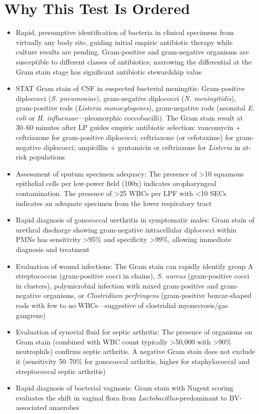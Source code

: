 \section*{Why This Test Is Ordered}
\begin{itemize}
  \item Rapid, presumptive identification of bacteria in clinical specimens from virtually any body site, guiding initial empiric antibiotic therapy while culture results are pending. Gram-positive and gram-negative organisms are susceptible to different classes of antibiotics; narrowing the differential at the Gram stain stage has significant antibiotic stewardship value
  \item STAT Gram stain of CSF in suspected bacterial meningitis: Gram-positive diplococci (\textit{S. pneumoniae}), gram-negative diplococci (\textit{N. meningitidis}), gram-positive rods (\textit{Listeria monocytogenes}), gram-negative rods (neonatal \textit{E. coli} or \textit{H. influenzae}---pleomorphic coccobacilli). The Gram stain result at 30--60 minutes after LP guides empiric antibiotic selection: vancomycin + ceftriaxone for gram-positive diplococci; ceftriaxone (or cefotaxime) for gram-negative diplococci; ampicillin + gentamicin or ceftriaxone for \textit{Listeria} in at-risk populations
  \item Assessment of sputum specimen adequacy: The presence of >10 squamous epithelial cells per low-power field (100x) indicates oropharyngeal contamination. The presence of >25 WBCs per LPF with <10 SECs indicates an adequate specimen from the lower respiratory tract
  \item Rapid diagnosis of gonococcal urethritis in symptomatic males: Gram stain of urethral discharge showing gram-negative intracellular diplococci within PMNs has sensitivity >95\% and specificity >99\%, allowing immediate diagnosis and treatment
  \item Evaluation of wound infections: The Gram stain can rapidly identify group A streptococcus (gram-positive cocci in chains), \textit{S. aureus} (gram-positive cocci in clusters), polymicrobial infection with mixed gram-positive and gram-negative organisms, or \textit{Clostridium perfringens} (gram-positive boxcar-shaped rods with few to no WBCs---suggestive of clostridial myonecrosis/gas gangrene)
  \item Evaluation of synovial fluid for septic arthritis: The presence of organisms on Gram stain (combined with WBC count typically >50,000 with >90\% neutrophils) confirms septic arthritis. A negative Gram stain does not exclude it (sensitivity 50--70\% for gonococcal arthritis, higher for staphylococcal and streptococcal septic arthritis)
  \item Rapid diagnosis of bacterial vaginosis: Gram stain with Nugent scoring evaluates the shift in vaginal flora from \textit{Lactobacillus}-predominant to BV-associated anaerobes
\end{itemize}

